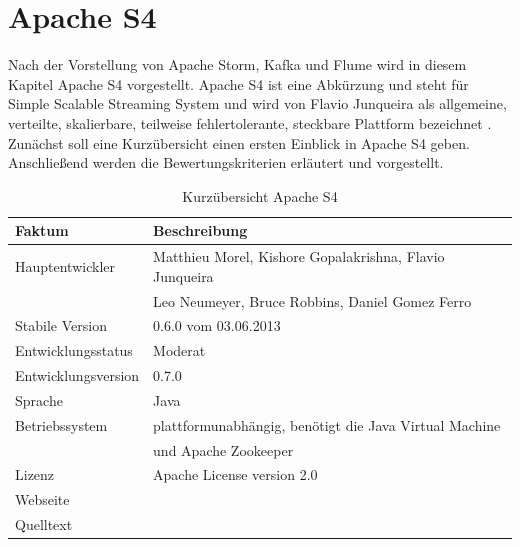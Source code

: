 \section{Apache S4}


Nach der Vorstellung von Apache Storm, Kafka und Flume wird in diesem Kapitel Apache S4 vorgestellt. Apache S4 ist eine Abkürzung und steht für Simple Scalable Streaming System und wird von Flavio Junqueira als allgemeine, verteilte, skalierbare, teilweise fehlertolerante, steckbare Plattform bezeichnet . Zunächst soll eine Kurzübersicht einen ersten Einblick in Apache S4 geben. Anschließend werden die Bewertungskriterien erläutert und vorgestellt.

\begin{table}[tbp]
	\centering
		\begin{tabular}{@{}ll@{}} \toprule
			\textbf{Faktum} & \textbf{Beschreibung} \\ \midrule
			Hauptentwickler & Matthieu Morel, Kishore Gopalakrishna, Flavio Junqueira \\
			& Leo Neumeyer, Bruce Robbins, Daniel Gomez Ferro \\
			Stabile Version & 0.6.0 vom 03.06.2013 \\ 
			Entwicklungsstatus &  Moderat \\
			Entwicklungsversion & 0.7.0 \\
			Sprache & Java \\
			Betriebssystem & plattformunabhängig, benötigt die Java Virtual Machine \\
			& und Apache Zookeeper \\
			Lizenz & Apache License version 2.0 \\
			Webseite & \citeint{s4:home} \\
			Quelltext & \citeint{s4:GitHubApacheMirror} \\			
			\bottomrule			
		\end{tabular}
	\caption{Kurzübersicht Apache S4}
	\label{tab:vors4}
\end{table}


